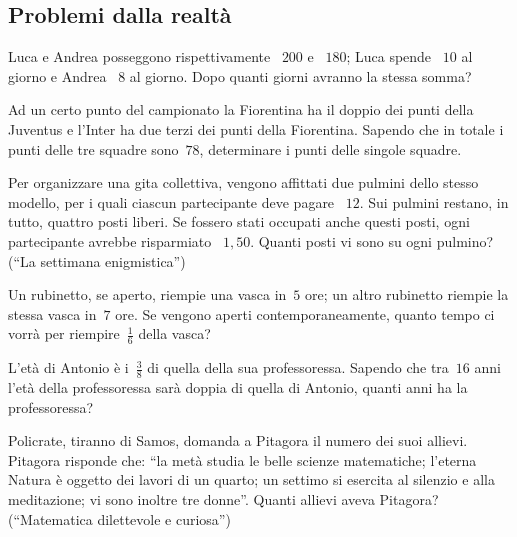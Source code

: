 \subsection{Problemi dalla realtà}
\begin{multicols}{2}
\begin{esercizio}[\Ast]
\label{ese:16.39}
Luca e Andrea posseggono rispettivamente \officialeuro~$200$ e \officialeuro~$180$; Luca spende \officialeuro~$10$ al giorno e Andrea \officialeuro~$8$ al giorno. Dopo quanti giorni avranno la stessa somma?
\end{esercizio}

\begin{esercizio}[\Ast]
\label{ese:16.40}
Ad un certo punto del campionato la Fiorentina ha il doppio dei punti della Juventus e l'Inter ha due terzi dei punti della Fiorentina. Sapendo che in totale i punti delle tre squadre sono~$78$, determinare i punti delle singole squadre.
\end{esercizio}

\begin{esercizio}[\Ast]
\label{ese:16.41}
Per organizzare una gita collettiva, vengono affittati due pulmini dello stesso modello, per i quali ciascun partecipante deve pagare \officialeuro~$12$. Sui pulmini restano, in tutto, quattro posti liberi. Se fossero stati occupati anche questi posti, ogni partecipante avrebbe risparmiato \officialeuro~$1,50$. Quanti posti vi sono su ogni pulmino? (``La settimana enigmistica'')
\end{esercizio}

\begin{esercizio}
\label{ese:16.42}
Un rubinetto, se aperto, riempie una vasca in~$5$ ore; un altro rubinetto riempie la stessa vasca in~$7$ ore. Se vengono aperti contemporaneamente, quanto tempo ci vorrà per riempire~$\frac{1}{6}$ della vasca?
\end{esercizio}

\begin{esercizio}[\Ast]
\label{ese:16.43}
L'età di Antonio è i~$\frac{3}{8}$ di quella della sua professoressa. Sapendo che tra~$16$ anni l'età della professoressa sarà doppia di quella di Antonio, quanti anni ha la professoressa?
\end{esercizio}

\begin{esercizio}[\Ast]
\label{ese:16.44}
Policrate, tiranno di Samos, domanda a Pitagora il numero dei suoi allievi. Pitagora risponde che: ``la metà studia le belle scienze matematiche; l'eterna Natura è oggetto dei lavori di un quarto; un settimo si esercita al silenzio e alla meditazione; vi sono inoltre tre donne''. Quanti allievi aveva Pitagora? (``Matematica dilettevole e curiosa'')
\end{esercizio}


\end{multicols}
